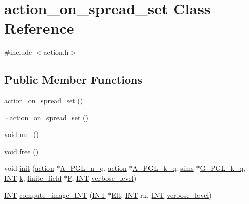 \hypertarget{classaction__on__spread__set}{}\section{action\+\_\+on\+\_\+spread\+\_\+set Class Reference}
\label{classaction__on__spread__set}


{\ttfamily \#include $<$action.\+h$>$}

\subsection*{Public Member Functions}
\begin{DoxyCompactItemize}
\item 
\mbox{\hyperlink{classaction__on__spread__set_ad7bf9accd7523d3f686eaaf257acdde2}{action\+\_\+on\+\_\+spread\+\_\+set}} ()
\item 
\mbox{\hyperlink{classaction__on__spread__set_aaf42a542a1e5cf6a6735dfdf35a9d29e}{$\sim$action\+\_\+on\+\_\+spread\+\_\+set}} ()
\item 
void \mbox{\hyperlink{classaction__on__spread__set_ae098ae70505b0044df033e8431898602}{null}} ()
\item 
void \mbox{\hyperlink{classaction__on__spread__set_a57fa3a018254a9a4024ec69ff313ee4e}{free}} ()
\item 
void \mbox{\hyperlink{classaction__on__spread__set_a9319d36cd7e051dd55d8a1fe07df6485}{init}} (\mbox{\hyperlink{classaction}{action}} $\ast$\mbox{\hyperlink{classaction__on__spread__set_a62ad6313e28bea11aa6ff84b5dddb512}{A\+\_\+\+P\+G\+L\+\_\+n\+\_\+q}}, \mbox{\hyperlink{classaction}{action}} $\ast$\mbox{\hyperlink{classaction__on__spread__set_aa17cebd06f6d9ece00607c9ad242df93}{A\+\_\+\+P\+G\+L\+\_\+k\+\_\+q}}, \mbox{\hyperlink{classsims}{sims}} $\ast$\mbox{\hyperlink{classaction__on__spread__set_a8699ddf7bb77424cafa67c0826077eb8}{G\+\_\+\+P\+G\+L\+\_\+k\+\_\+q}}, \mbox{\hyperlink{galois_8h_a09fddde158a3a20bd2dcadb609de11dc}{I\+NT}} \mbox{\hyperlink{classaction__on__spread__set_ae55145e8d9f8e72d36bcf7bdd4eff8ad}{k}}, \mbox{\hyperlink{classfinite__field}{finite\+\_\+field}} $\ast$\mbox{\hyperlink{classaction__on__spread__set_ab8043d98d961548859443848354d65d6}{F}}, \mbox{\hyperlink{galois_8h_a09fddde158a3a20bd2dcadb609de11dc}{I\+NT}} \mbox{\hyperlink{simeon_8_c_a818073fbcc2f439e7c56952f67386122}{verbose\+\_\+level}})
\item 
\mbox{\hyperlink{galois_8h_a09fddde158a3a20bd2dcadb609de11dc}{I\+NT}} \mbox{\hyperlink{classaction__on__spread__set_a424ae719c98b5d99978e60f8f2d65437}{compute\+\_\+image\+\_\+\+I\+NT}} (\mbox{\hyperlink{galois_8h_a09fddde158a3a20bd2dcadb609de11dc}{I\+NT}} $\ast$\mbox{\hyperlink{simeon_8_c_aec1406935bdb1fee3561fcb840964100}{Elt}}, \mbox{\hyperlink{galois_8h_a09fddde158a3a20bd2dcadb609de11dc}{I\+NT}} rk, \mbox{\hyperlink{galois_8h_a09fddde158a3a20bd2dcadb609de11dc}{I\+NT}} \mbox{\hyperlink{simeon_8_c_a818073fbcc2f439e7c56952f67386122}{verbose\+\_\+level}})

\end{DoxyCompactItemize}
